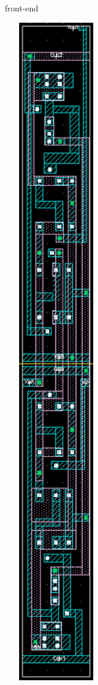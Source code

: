 \documentclass[11pt,a4paper,oneside,dutch]{article}
\begin{document}
\begin{figure}[htp]
\begin{subfigure}[b]{0.25\textwidth}
		\caption{front-end}
	\end{subfigure}
	\quad
	\begin{subfigure}[b]{0.25\textwidth}
		\centering
		\includegraphics[width=0.5\textwidth]{elementary_backend.png}

\end{subfigure}
\end{figure}
\end{document}
